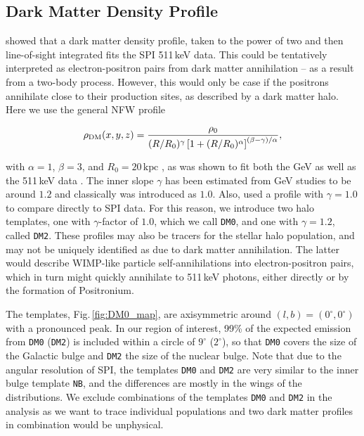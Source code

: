 \documentclass[doublespace,draft,nopageskip]{VTthesis} %
\newcommand{\mrm}[1]{\mathrm{#1}}
\begin{document}
\begin{appendices}
	
	\subsection{Dark Matter Density Profile}
	
	\citet{Skinner2014_511} showed that a dark matter density profile, taken to the power of two and then line-of-sight integrated fits the SPI 511\,keV data.
	This could be tentatively interpreted as electron-positron pairs from dark matter annihilation -- as a result from a two-body process.
	However, this would only be case if the positrons annihilate close to their production sites, as described by a dark matter halo.
	Here we use the general NFW profile \citep{Navarro1997_NFW}
	
	\begin{equation}
		\rho_{\rm DM}(x,y,z) = \frac{\rho_0}{(R/R_0)^{\gamma}\left[1+(R/R_0)^{\alpha}\right]^{(\beta-\gamma)/\alpha}}\mrm{,}
		\label{eq:NFW_profile}
	\end{equation}
	
	\noindent with $\alpha=1$, $\beta=3$, and $R_0=20\,\mrm{kpc}$ \citep{Abazajian2014_DMGeV}, as was shown to fit both the GeV \citep{Hooper2011_DMGeV,Abazajian2014_DMGeV,Daylan2016_GeVDM} as well as the 511\,keV data \citep{Vincent2012_dm511,Skinner2014_511}.
	The inner slope $\gamma$ has been estimated from GeV studies to be around $1.2$ and classically was introduced as $1.0$.
	Also, \citet{Skinner2014_511} used a profile with $\gamma=1.0$ to compare directly to SPI data.
	For this reason, we introduce two halo templates, one with $\gamma$-factor of $1.0$, which we call \texttt{DM0}, and one with $\gamma=1.2$, called \texttt{DM2}.
	These profiles may also be tracers for the stellar halo population, and may not be uniquely identified as due to dark matter annihilation.
	The latter would describe WIMP-like particle self-annihilations into electron-positron pairs, which in turn might quickly annihilate to 511\,keV photons, either directly or by the formation of Positronium.
	
	The templates, Fig.\,\ref{fig:DM0_map}, are axisymmetric around $(l,b)=(0^{\circ},0^{\circ})$ with a pronounced peak.
	In our region of interest, 99\% of the expected emission from \texttt{DM0} (\texttt{DM2}) is included within a circle of $9^{\circ}$ ($2^{\circ}$), so that \texttt{DM0} covers the size of the Galactic bulge and \texttt{DM2} the size of the nuclear bulge.
	Note that due to the angular resolution of SPI, the templates \texttt{DM0} and \texttt{DM2} are very similar to the inner bulge template \texttt{NB}, and the differences are mostly in the wings of the distributions.
	We exclude combinations of the templates \texttt{DM0} and \texttt{DM2} in the analysis as we want to trace individual populations and two dark matter profiles in combination would be unphysical.
	

\end{appendices}
\end{document}
